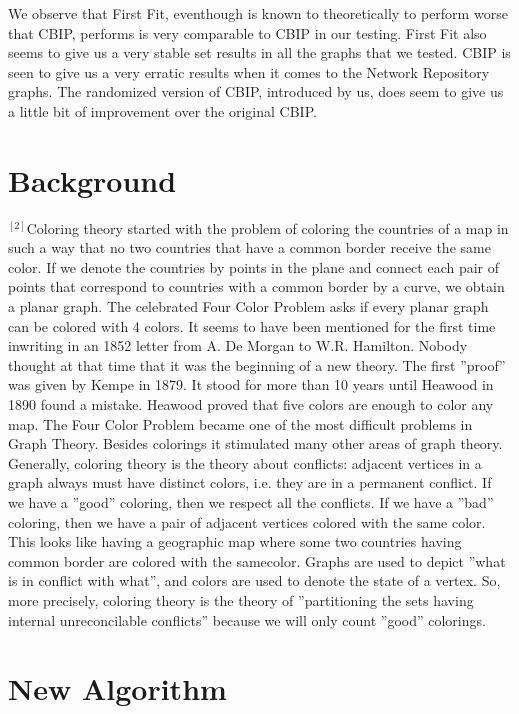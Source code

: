 \documentclass{article}
\begin{document}
 We observe that First Fit, eventhough is known to theoretically to perform worse that CBIP, performs is very comparable to CBIP in our testing.
First Fit also seems to give us a very stable set results in all the graphs that we tested.
CBIP is seen to give us a very erratic results when it comes to the Network Repository graphs. 
 The randomized version of CBIP, introduced by us, does seem to give us a little bit of improvement over the original CBIP.


\section{Background} 

$^{[2]}$Coloring  theory  started  with  the  problem  of  coloring  the countries of a map in such a way that no two countries that have a common border receive the same color.  If we denote the countries by points in the plane and connect each pair of points that correspond to countries with a common border by a curve, we obtain a planar graph. The celebrated Four Color Problem  asks  if  every  planar  graph  can  be  colored  with  4 colors.  It seems to have been mentioned for the first time inwriting in an 1852 letter from A. De Morgan to W.R. Hamilton. Nobody thought at that time that it was the beginning of a new theory. The first ”proof” was given by Kempe in 1879. It stood for more than 10 years until Heawood in 1890 found a mistake.   Heawood proved that five colors are enough to color any map.  The Four Color Problem became one of the most difficult problems in Graph Theory. Besides colorings it stimulated many other areas of graph theory. Generally, coloring theory is the theory about conflicts:  adjacent vertices in a graph always must have distinct colors, i.e.  they are in a permanent conflict. If we have a ”good” coloring, then we respect all the conflicts. If we have a ”bad” coloring, then we have a pair of adjacent vertices colored with the same color. This  looks  like  having  a  geographic  map  where  some  two countries having common border are colored with the samecolor. Graphs  are  used  to  depict  ”what  is  in  conflict  with what”, and colors are used to denote the state of a vertex. So, more precisely, coloring theory is the theory of ”partitioning the sets having internal unreconcilable conflicts” because we will only count ”good” colorings.

\newpage

\section{New Algorithm}
\end{document}
